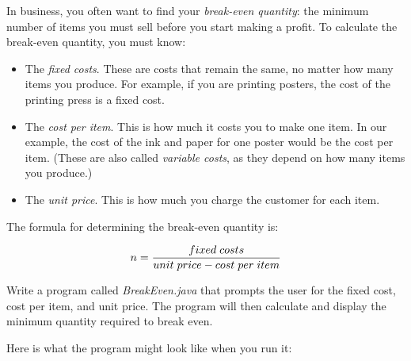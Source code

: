 \begin{exercise}
In business, you often want to find your {\em break-even quantity}: the minimum number of items you must sell before you start making a profit. To calculate the break-even quantity, you must know:

\begin{itemize}
\item The {\em fixed costs}. These are costs that remain the same, no matter how many items you produce. For example, if you are printing posters, the cost of the printing press is a fixed cost.
\item The {\em cost per item}. This is how much it costs you to make one item. In our example, the cost of the ink and paper for one poster would be the cost per item. (These are also called {\em variable costs}, as they depend on how many items you produce.)
\item The {\em unit price}. This is how much you charge the customer for each item.
\end{itemize}

The formula for determining the break-even quantity is:

\begin{equation*}
n = {fixed\; costs \over {unit\; price - cost\; per\; item}}
\end{equation*}

Write a program called {\em BreakEven.java} that prompts the user for the fixed cost, cost per item, and unit price. The program will then calculate and display the minimum quantity required to break even.

Here is what the program might look like when you run it:




\end{exercise}

